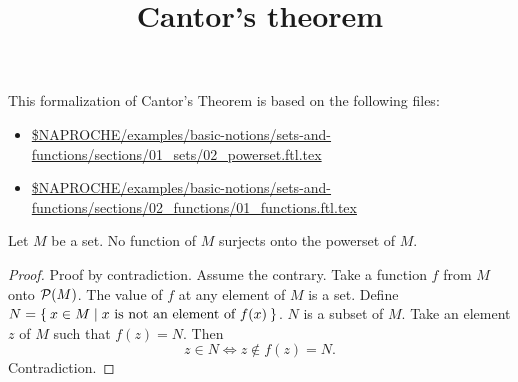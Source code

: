 \documentclass{article}
\title{Cantor's theorem}
\author{}
\date{}
\begin{document}

  \maketitle

  This formalization of Cantor's Theorem is based on the following files:

  \begin{itemize}
    \item \url{$NAPROCHE/examples/basic-notions/sets-and-functions/sections/01_sets/02_powerset.ftl.tex}
    \item \url{$NAPROCHE/examples/basic-notions/sets-and-functions/sections/02_functions/01_functions.ftl.tex}
  \end{itemize}


  \begin{forthel}
    \begin{theorem}[Cantor]
      Let $M$ be a set.
      No function of $M$ surjects onto the powerset of $M$.
    \end{theorem}
    \begin{proof}
      Proof by contradiction.
      Assume the contrary.
      Take a function $f$ from $M$ onto $\mathcal{P}(M)$.
      The value of $f$ at any element of $M$ is a set.
      Define $N = \Set{x \in M | \text{$x$ is not an element of $f(x)$}}$.
      $N$ is a subset of $M$.
      Take an element $z$ of $M$ such that $f(z) = N$.
      Then \[ z \in N \iff z \notin f(z) = N. \]
      Contradiction.
    \end{proof}
  \end{forthel}
\end{document}
